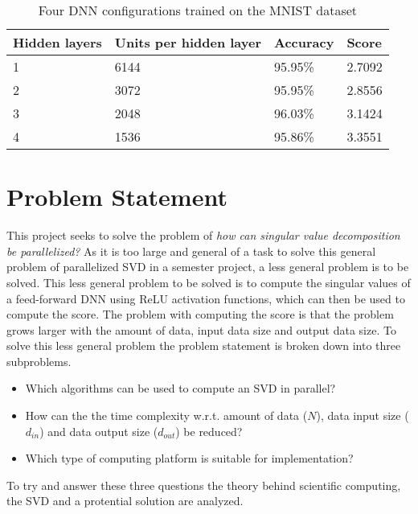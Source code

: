 \begin{table}[H]
  \centering
    \begin{tabular}{|l|l|l|l|} \hline
      Hidden layers & Units per hidden layer & Accuracy & Score \\ \hline
      1 & 6144 & 95.95\% & 2.7092 \\ \hline
      2 & 3072 & 95.95\% & 2.8556 \\ \hline
      3 & 2048 & 96.03\% & 3.1424 \\ \hline
      4 & 1536 & 95.86\% & 3.3551 \\ \hline
    \end{tabular}
    \caption{Four DNN configurations trained on the MNIST dataset}
    \label{tab:dnn:score}
  \end{table}



\section{Problem Statement}

This project seeks to solve the problem of \textit{how can singular value decomposition be parallelized?} As it is too large and general of a task to solve this general problem of parallelized SVD in a semester project, a less general problem is to be solved. This less general problem to be solved is to compute the singular values of a feed-forward DNN using ReLU activation functions, which can then be used to compute the score. The problem with computing the score is that the problem grows larger with the amount of data, input data size and output data size. To solve this less general problem the problem statement is broken down into three subproblems.

\begin{itemize}
\item Which algorithms can be used to compute an SVD in parallel?
\item How can the the time complexity w.r.t. amount of data ($N$), data input size ($d_{in}$) and data output size ($d_{out}$) be reduced?
\item Which type of computing platform is suitable for implementation?
\end{itemize}

\noindent To try and answer these three questions the theory behind scientific computing, the SVD and a protential solution are analyzed.

